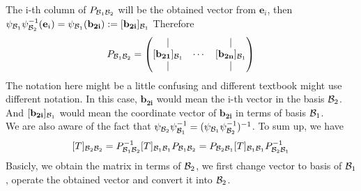 The i-th column of $P_{\mathcal{B}_1 \mathcal{B}_2}$ will be the obtained vector from $\mathbf{e}_i$, then $\psi_{\mathcal{B}_1}\psi_{\mathcal{B}_2}^{-1}(\mathbf{e}_i) = \psi_{\mathcal{B}_1}(\mathbf{b_{2i}}):=[\mathbf{b_{2i}}]_{\mathcal{B}_1}$ 
Therefore
$$P_{\mathcal{B}_1 \mathcal{B}_2} = \begin{pmatrix}
    |& \ & | \\
    [\mathbf{b_{21}}]_{\mathcal{B}_1}& \cdots& [\mathbf{b_{2n}}]_{\mathcal{B}_1} \\
    |& \ & | \\
\end{pmatrix}$$
The notation here might be a little confusing and different textbook might use different notation. In this case, $\mathbf{b_{2i}}$ would mean the i-th vector in the basis $\mathcal{B}_2$.
And $[\mathbf{b_{2i}}]_{\mathcal{B}_1}$ would mean the coordinate vector of $\mathbf{b_{2i}}$ in terms of basis $\mathcal{B}_1$.\\

We are also aware of the fact that $\psi_{\mathcal{B}_2}\psi_{\mathcal{B}_1}^{-1}=(\psi_{\mathcal{B}_1}\psi_{\mathcal{B}_2}^{-1})^{-1}$. To sum up, we have 
$$[T]_{\mathcal{B}_2 \mathcal{B}_2} = P_{\mathcal{B}_1 \mathcal{B}_2}^{-1}[T]_{\mathcal{B}_1 \mathcal{B}_1}P_{\mathcal{B}_1 \mathcal{B}_2} = P_{\mathcal{B}_2 \mathcal{B}_1}[T]_{\mathcal{B}_1 \mathcal{B}_1}P_{\mathcal{B}_2 \mathcal{B}_1}^{-1}$$
Basicly, we obtain the matrix in terms of $\mathcal{B}_2$, we first change vector to basis of $\mathcal{B}_1$, operate the obtained vector and convert it into $\mathcal{B}_2$.\\

